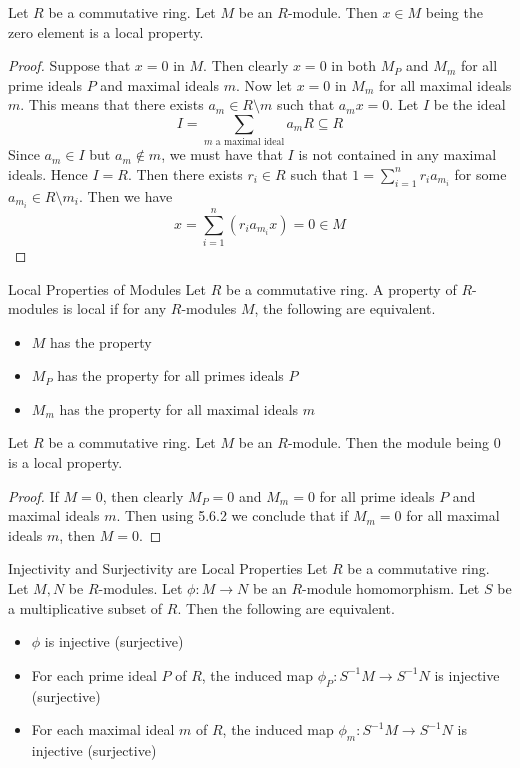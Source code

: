 \documentclass[a4paper]{article}
\begin{document}
\begin{lmm}{}{} Let $R$ be a commutative ring. Let $M$ be an $R$-module. Then $x\in M$ being the zero element is a local property. 
\begin{proof}
Suppose that $x=0$ in $M$. Then clearly $x=0$ in both $M_P$ and $M_m$ for all prime ideals $P$ and maximal ideals $m$. Now let $x=0$ in $M_m$ for all maximal ideals $m$. This means that there exists $a_m\in R\setminus m$ such that $a_mx=0$. Let $I$ be the ideal $$I=\sum_{m\text{ a maximal ideal}}a_mR\subseteq R$$ Since $a_m\in I$ but $a_m\notin m$, we must have that $I$ is not contained in any maximal ideals. Hence $I=R$. Then there exists $r_i\in R$ such that $1=\sum_{i=1}^nr_ia_{m_i}$ for some $a_{m_i}\in R\setminus m_i$. Then we have $$x=\sum_{i=1}^n(r_ia_{m_i}x)=0\in M$$
\end{proof}
\end{lmm}

\begin{defn}{Local Properties of Modules}{} Let $R$ be a commutative ring. A property of $R$-modules is local if for any $R$-modules $M$, the following are equivalent. 
\begin{itemize}
\item $M$ has the property
\item $M_P$ has the property for all primes ideals $P$
\item $M_m$ has the property for all maximal ideals $m$
\end{itemize}
\end{defn}

\begin{lmm}{}{} Let $R$ be a commutative ring. Let $M$ be an $R$-module. Then the module being $0$ is a local property. 
\begin{proof}
If $M=0$, then clearly $M_P=0$ and $M_m=0$ for all prime ideals $P$ and maximal ideals $m$. Then using 5.6.2 we conclude that if $M_m=0$ for all maximal ideals $m$, then $M=0$. 
\end{proof}
\end{lmm}

\begin{prp}{Injectivity and Surjectivity are Local Properties}{} Let $R$ be a commutative ring. Let $M,N$ be $R$-modules. Let $\phi:M\to N$ be an $R$-module homomorphism. Let $S$ be a multiplicative subset of $R$. Then the following are equivalent. 
\begin{itemize}
\item $\phi$ is injective (surjective)
\item For each prime ideal $P$ of $R$, the induced map $\phi_P:S^{-1}M\to S^{-1}N$ is injective (surjective)
\item For each maximal ideal $m$ of $R$, the induced map $\phi_m:S^{-1}M\to S^{-1}N$ is injective (surjective)
\end{itemize}
\end{prp}
\end{document}
